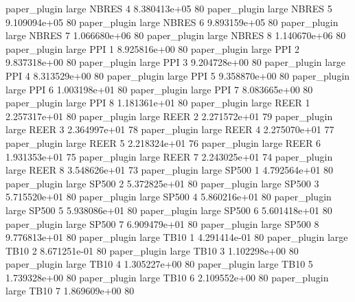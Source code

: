       paper_plugin      large    NBRES                 4 8.380413e+05 80
       paper_plugin      large    NBRES                 5 9.109094e+05 80
       paper_plugin      large    NBRES                 6 9.893159e+05 80
       paper_plugin      large    NBRES                 7 1.066680e+06 80
       paper_plugin      large    NBRES                 8 1.140670e+06 80
       paper_plugin      large      PPI                 1 8.925816e+00 80
       paper_plugin      large      PPI                 2 9.837318e+00 80
       paper_plugin      large      PPI                 3 9.204728e+00 80
       paper_plugin      large      PPI                 4 8.313529e+00 80
       paper_plugin      large      PPI                 5 9.358870e+00 80
       paper_plugin      large      PPI                 6 1.003198e+01 80
       paper_plugin      large      PPI                 7 8.083665e+00 80
       paper_plugin      large      PPI                 8 1.181361e+01 80
       paper_plugin      large     REER                 1 2.257317e+01 80
       paper_plugin      large     REER                 2 2.271572e+01 79
       paper_plugin      large     REER                 3 2.364997e+01 78
       paper_plugin      large     REER                 4 2.275070e+01 77
       paper_plugin      large     REER                 5 2.218324e+01 76
       paper_plugin      large     REER                 6 1.931353e+01 75
       paper_plugin      large     REER                 7 2.243025e+01 74
       paper_plugin      large     REER                 8 3.548626e+01 73
       paper_plugin      large    SP500                 1 4.792564e+01 80
       paper_plugin      large    SP500                 2 5.372825e+01 80
       paper_plugin      large    SP500                 3 5.715520e+01 80
       paper_plugin      large    SP500                 4 5.860216e+01 80
       paper_plugin      large    SP500                 5 5.938086e+01 80
       paper_plugin      large    SP500                 6 5.601418e+01 80
       paper_plugin      large    SP500                 7 6.909479e+01 80
       paper_plugin      large    SP500                 8 9.776813e+01 80
       paper_plugin      large     TB10                 1 4.291414e-01 80
       paper_plugin      large     TB10                 2 8.671251e-01 80
       paper_plugin      large     TB10                 3 1.102298e+00 80
       paper_plugin      large     TB10                 4 1.305227e+00 80
       paper_plugin      large     TB10                 5 1.739328e+00 80
       paper_plugin      large     TB10                 6 2.109552e+00 80
       paper_plugin      large     TB10                 7 1.869609e+00 80
